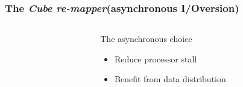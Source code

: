 \documentclass[slidestop,xcolor=dvipsnames, notes=hide]{beamer}
\newcommand{\toolTargetSoftware}			{\emph{Cube re-mapper}}
\newcommand{\notationIO}					{I/O}
\newcommand{\notationaio}					{asynchronous \notationIO}
\begin{document}
		\begin{frame}
			\frametitle{The \toolTargetSoftware\space (\notationaio\space version)}
			\begin{columns}[T]
				\begin{column}{.5\textwidth}
					\begin{minipage}[b]{0.6\textwidth}%
						\lst
					\end{minipage}
				\end{column}


				\begin{column}{.5\textwidth}
					\pause
					\begin{block}{The asynchronous choice}
						\begin{itemize}
							\item Reduce processor stall
							\pause
							\item Benefit from data distribution
						\end{itemize}
					\end{block}
				\end{column}
			\end{columns}
		\end{frame}


\end{document}
